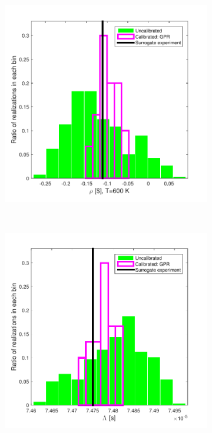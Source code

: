 \documentclass[review]{elsarticle}
\begin{document}
\begin{figure}[ht!]
\begin{subfigure}{0.5\textwidth}
\centering
\includegraphics[width=0.9\linewidth]{NSE15-48R1_Figure15a.pdf}
\label{gptrho6k}
\end{subfigure}
~
\begin{subfigure}{0.5\textwidth}
\centering
\includegraphics[width=0.9\linewidth]{NSE15-48R1_Figure15b.pdf}

\end{subfigure}
\end{figure}
\end{document}
